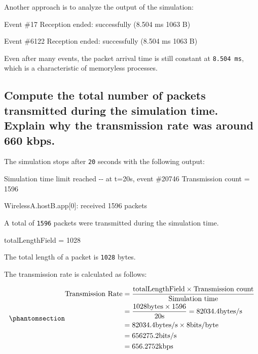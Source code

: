 \documentclass[
  letterpaper,
  DIV=11,
  numbers=noendperiod]{scrartcl}
\newenvironment{Shaded}{\begin{snugshade}}{\end{snugshade}}
\newcommand{\NormalTok}[1]{\textcolor[rgb]{0.00,0.23,0.31}{#1}}
\begin{document}
Another approach is to analyze the output of the simulation:

\begin{Shaded}
\begin{Highlighting}[]
\NormalTok{Event \#17}
\NormalTok{Reception ended: successfully}
\NormalTok{  (8.504 ms 1063 B)}

\NormalTok{Event \#6122}
\NormalTok{Reception ended: successfully}
\NormalTok{  (8.504 ms 1063 B)}
\end{Highlighting}
\end{Shaded}

Even after many events, the packet arrival time is still constant at
\texttt{8.504\ ms}, which is a characteristic of memoryless processes.

\subsection{Compute the total number of packets transmitted during the
simulation time. Explain why the transmission rate was around 660
kbps.}\label{compute-the-total-number-of-packets-transmitted-during-the-simulation-time.-explain-why-the-transmission-rate-was-around-660-kbps.}

The simulation stops after \texttt{20} seconds with the following
output:

\begin{Shaded}
\begin{Highlighting}[]
\NormalTok{Simulation time limit reached}
\NormalTok{  {-}{-} at t=20s, event \#20746}
\NormalTok{Transmission count = 1596}

\NormalTok{WirelessA.hostB.app[0]:}
\NormalTok{  received 1596 packets}
\end{Highlighting}
\end{Shaded}

A total of \texttt{1596} packets were transmitted during the simulation
time.

\begin{Shaded}
\begin{Highlighting}[]
\NormalTok{totalLengthField = 1028}
\end{Highlighting}
\end{Shaded}

The total length of a packet is \texttt{1028} bytes.

The transmission rate is calculated as follows:

\begin{equation}\phantomsection\label{eq-transmission_rate}{
\begin{aligned}
\text{Transmission Rate} &= \frac{\text{totalLengthField} \times \text{Transmission count}}{\text{Simulation time}} \\
&= \frac{1028 \text{bytes} \times 1596}{20 \text{s}} = 82034.4 \text{bytes/s} \\
&= 82034.4 \text{bytes/s} \times 8 \text{bits/byte} \\
&= 656275.2 \text{bits/s} \\
&= 656.2752 \text{kbps}
\end{aligned}
}\end{equation}
\end{document}
